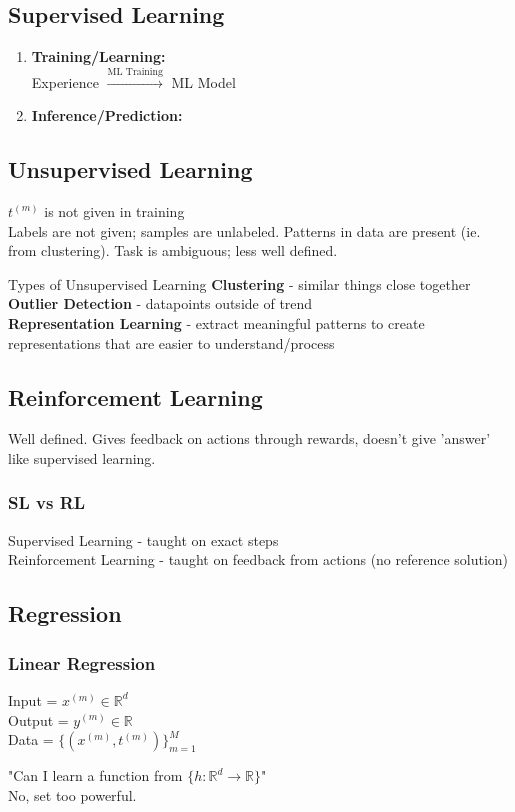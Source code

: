 \documentclass{article}
\begin{document}
\subsection{Supervised Learning}
\begin{enumerate}
  \item \textbf{Training/Learning: } \\Experience $\xrightarrow{\text{ML Training}}$ ML Model
  \item \textbf{Inference/Prediction: } 
\end{enumerate}

\subsection{Unsupervised Learning}
$t^{(m)}$ is not given in training \\[3pt]
Labels are not given; samples are unlabeled. Patterns in data are present (ie. from clustering).
Task is ambiguous; less well defined.
\begin{example}
  {Types of Unsupervised Learning}{}
  \textbf{Clustering} - similar things close together \\
  \textbf{Outlier Detection} - datapoints outside of trend \\
  \textbf{Representation Learning} - extract meaningful patterns 
  to create representations that are easier to understand/process
\end{example}

\subsection{Reinforcement Learning}
Well defined. Gives feedback on actions through rewards, 
doesn't give 'answer' like supervised learning.
\subsubsection{SL vs RL}
Supervised Learning - taught on exact steps
\\
Reinforcement Learning - taught on feedback from actions (no reference solution)


\subsection{Regression}
\subsubsection{Linear Regression}
Input = $x^{(m)} \in \mathbb R ^d$ \\
Output = $y^{(m)} \in \mathbb R$ \\
Data = $ \{ ( x^{(m)}, t^{(m)} ) \}_{m=1}^M $
\begin{expln}
  {}{}
  "Can I learn a function from $\{ h: \mathbb R^d \to \mathbb R\}$" \\
  No, set too powerful.
\end{expln}
\end{document}
